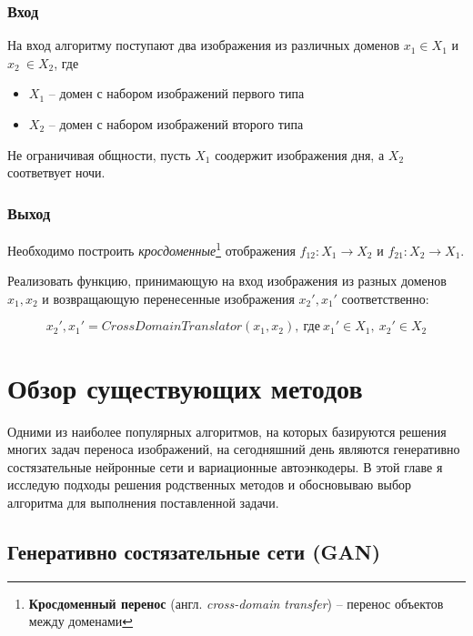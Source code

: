 \documentclass[11pt,a4paper]{extarticle}
\begin{document}
		\subsubsection*{Вход}
			На вход алгоритму поступают два изображения из различных доменов \(x_{1} \in X_{1}\)  и \(x_{2}\ \in X_{2}\), где
			\begin{itemize}
				\item \(X_{1}\) -- домен с набором изображений первого типа
				\item \(X_{2}\) -- домен с набором изображений второго типа
			\end{itemize}
			Не ограничивая общности, пусть \(X_{1}\) соодержит изображения дня, а \(X_{2}\) соответвует ночи.
		\vspace{-1em}
		\subsubsection*{Выход}
			Необходимо построить \textit{кросдоменные}\footnote{
				\textbf{Кросдоменный перенос} (англ. \textit{cross-domain transfer}) -- перенос объектов между доменами 
			} отображения \(f_{12}\!: X_{1} \longrightarrow X_{2}\) и \(f_{21}\!: X_{2} \longrightarrow X_{1}\).
			
			\noindent
			Реализовать функцию, принимающую на вход изображения из разных доменов
			\(x_{1}, x_{2}\) и возвращающую перенесенные изображения \(x_{2}', x_{1}'\) соответственно: 

			\begin{equation}
				x_{2}', x_{1}' = CrossDomainTranslator(x_{1}, x_{2}),\ \text{где}\ x_{1}' \in X_{1},\ x_{2}' \in X_{2}
			\end{equation}
	

\newpage
\section{Обзор существующих методов}
	
	Одними из наиболее популярных алгоритмов, на которых базируются решения многих задач переноса изображений, на сегодняшний день являются
	генеративно состязательные нейронные сети и вариационные автоэнкодеры.
	В этой главе я исследую подходы решения родственных методов и обосновываю выбор алгоритма для выполнения поставленной задачи. 


	\subsection{Генеративно состязательные сети (GAN)}		
\end{document}
